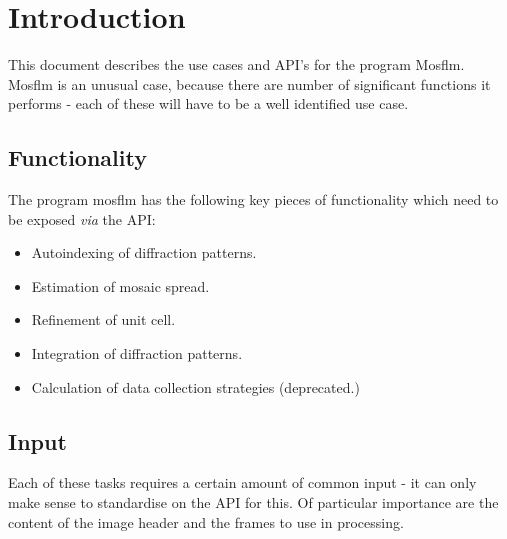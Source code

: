 \documentclass[a4paper, 11pt]{article}
\begin{document}
\section{Introduction}

This document describes the use cases and API's for the program Mosflm.
Mosflm is an unusual case, because there are number of significant 
functions it performs - each of these will have to be a well identified 
use case.

\subsection{Functionality}

The program mosflm has the following key pieces of functionality which need 
to be exposed \emph{via} the API:

\begin{itemize}
\item{Autoindexing of diffraction patterns.}
\item{Estimation of mosaic spread.}
\item{Refinement of unit cell.}
\item{Integration of diffraction patterns.}
\item{Calculation of data collection strategies (deprecated.)}
\end{itemize}

\subsection{Input}

Each of these tasks requires a certain amount of common input - it can only 
make sense to standardise on the API for this. Of particular importance
are the content of the image header and the frames to use in processing.
\end{document}
